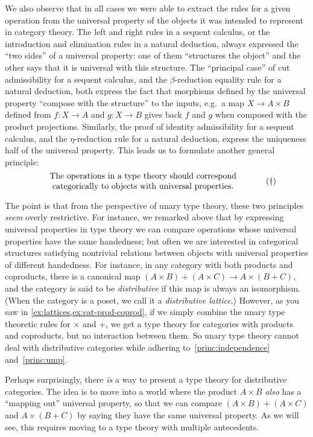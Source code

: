 \documentclass{book}
\begin{document}
We also observe that in all cases we were able to extract the rules for a given operation from the universal property of the objects it was intended to represent in category theory.
The left and right rules in a sequent calculus, or the introduction and elimination rules in a natural deduction, always expressed the ``two sides'' of a universal property: one of them ``structures the object'' and the other says that it is universal with this structure.
The ``principal case'' of cut admissibility for a sequent calculus, and the $\beta$-reduction equality rule for a natural deduction, both express the fact that morphisms defined by the universal property ``compose with the structure'' to the inputs, e.g.\ a map $X\to A\times B$ defined from $f:X\to A$ and $g:X\to B$ gives back $f$ and $g$ when composed with the product projections.
Similarly, the proof of identity admissibility for a sequent calculus, and the $\eta$-reduction rule for a natural deduction, express the uniqueness half of the universal property.
This leads us to formulate another general principle:
\begin{equation}\label{princ:ump}
  \parbox{3.5in}{\centering The operations in a type theory should correspond categorically to objects with universal properties.}\tag{$\dagger$}
\end{equation}

The point is that from the perspective of unary type theory, these two principles \emph{seem} overly restrictive.
For instance, we remarked above that by expressing universal properties in type theory we can compare operations whose universal properties have the same handedness; but often we are interested in categorical structures satisfying nontrivial relations between objects with universal properties of different handedness.
For instance, in any category with both products and coproducts, there is a canonical map $(A\times B)+(A\times C) \to A\times (B+C)$, and the category is said to be \emph{distributive} if this map is always an isomorphism.
(When the category is a poset, we call it a \emph{distributive lattice}.)
However, as you saw in \cref{ex:lattices,ex:cat-prod-coprod}, if we simply combine the unary type theoretic rules for $\times$ and $+$, we get a type theory for categories with products and coproducts, but no interaction between them.
So unary type theory cannot deal with distributive categories while adhering to~\eqref{princ:independence} and~\eqref{princ:ump}.

Perhaps surprisingly, there \emph{is} a way to present a type theory for distributive categories.
The idea is to move into a world where the product $A\times B$ \emph{also} has a ``mapping out'' universal property, so that we can compare $(A\times B)+(A\times C)$ and $A\times (B+C)$ by saying they have the same universal property.
As we will see, this requires moving to a type theory with multiple antecedents.
\end{document}
